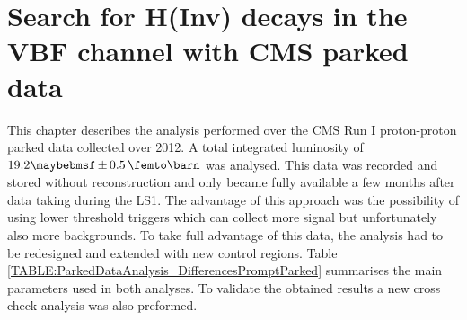 \chapter{Search for H(Inv) decays in the VBF channel with CMS parked data}
\label{CHAPTER:ParkedDataAnalysis}


%
%
%
%
%
%
%


This chapter describes the analysis performed over the \gls{CMS} Run I proton-proton parked data collected over 2012. A total integrated luminosity of $19.2 \pm 0.5\,\femto\barn$ was analysed. This data was recorded and stored without reconstruction and only became fully available a few months after data taking during the \gls{LS1}. The advantage of this approach was the possibility of using lower threshold triggers which can collect more signal but unfortunately also more backgrounds. To take full advantage of this data, the analysis had to be redesigned and extended with new control regions. Table \ref{TABLE:ParkedDataAnalysis_DifferencesPromptParked} summarises the main parameters used in both analyses. To validate the obtained results a new cross check analysis was also preformed.

